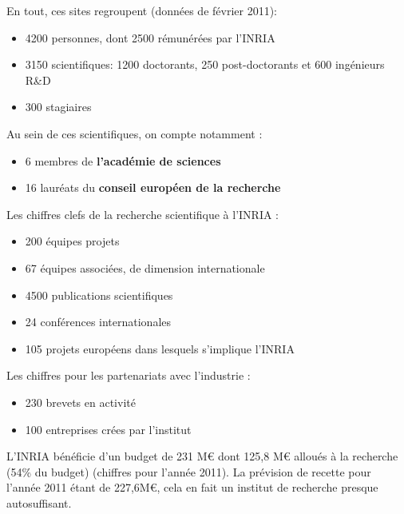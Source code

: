 \documentclass[a4paper, 11pt]{report}
\begin{document}
    En tout, ces sites regroupent (données de février 2011):
    \begin{itemize}
      \item 4200 personnes, dont 2500 rémunérées par l'INRIA
      \item 3150 scientifiques: 1200 doctorants, 250 post-doctorants et 600
        ingénieurs R\&D
      \item 300 stagiaires
    \end{itemize}
    Au sein de ces scientifiques, on compte notamment :
    \begin{itemize}
      \item 6 membres de \textbf{l'académie de sciences}
      \item 16 lauréats du \textbf{conseil européen de la recherche}
    \end{itemize}

    Les chiffres clefs de la recherche scientifique à l'INRIA :
    \begin{itemize}
      \item 200 équipes projets
      \item 67 équipes associées, de dimension internationale
      \item 4500 publications scientifiques
      \item 24 conférences internationales
      \item 105 projets européens dans lesquels s'implique l'INRIA
    \end{itemize}

    Les chiffres pour les partenariats avec l'industrie :
    \begin{itemize}
      \item 230 brevets en activité
      \item 100 entreprises crées par l'institut
    \end{itemize}

    L'INRIA bénéficie d'un budget de 231 M\euro{} dont 125,8 M\euro{} alloués à la
    recherche (54\% du budget) (chiffres pour l'année 2011). La prévision
    de recette pour l'année 2011 étant de 227,6M\euro{}, cela en fait un institut
    de recherche presque autosuffisant.
\end{document}
